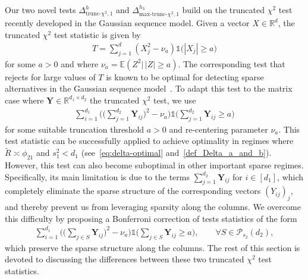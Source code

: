 \documentclass{article}
\newcommand{\R}{\mathbb{R}}
\newcommand{\one}{\mathds{1}}
\newcommand{\chisqlin}{\text{trunc-$\chi^2$}}
\newcommand{\chisqmax}{\text{max-trunc-$\chi^2$}}
\theoremstyle{remark}
\begin{document}
Our two novel tests $\Delta_{\chisqlin, 1}^h$ and $\Delta^{h_3}_{\chisqmax, 1}$ build on the truncated $\chi^2$ test recently developed in the Gaussian sequence model. 
Given a vector $X \in \R^d$, the truncated $\chi^2$ test statistic is given by
\begin{align*}
    T = \sum_{j=1}^d (X_j^2 - \nu_a) \one{\big(|X_j| \geq a\big)}
\end{align*}
for some $a>0$ and where $\nu_a = \mathbb E\left(Z^2 \big|\,|Z| \geq a\right)$. 
The corresponding test that rejects for large values of $T$ is known to be optimal for detecting sparse alternatives in the Gaussian sequence model~\citep{collier2017minimax}. 
To adapt this test to the matrix case where $\mathbf Y \in \R^{d_1 \times d_2}$ the truncated $\chi^2$ test, we use 
\begin{align*}
    \sum_{i=1}^{d_1} \Big(\Big(\sum_{j=1}^{d_2} \mathbf Y_{ij}\Big)^2 - \nu_a\Big)\one{\big(\sum_{j=1}^{d_2} \mathbf Y_{ij} \geq a\big)}
\end{align*}
for some suitable truncation threshold $a>0$ and re-centering parameter $\nu_a$. 
This test statistic can be successfully applied to achieve optimality in regimes where $\tilde R \asymp \phi_{21}$ and $s_1^2 < d_1$ (see~\eqref{eq:delta-optimal} and~\eqref{def_Delta_a_and_b}). 
However, this test can also become suboptimal in other important sparse regimes. 
Specifically, its main limitation is due to the terms $\sum_{j=1}^{d_2} \mathbf Y_{ij}$ for $i\in [d_1]$, which completely eliminate the sparse structure of the corresponding vectors $(Y_{ij})_{j}$, and thereby prevent us from leveraging sparsity along the columns. 
We overcome this difficulty by proposing a Bonferroni correction of tests statistics of the form
\begin{align*}
    \sum_{i=1}^{d_1} \Big(\Big(\sum_{j\in S} \mathbf Y_{ij}\Big)^2 - \nu_a\Big)\one{\big(\sum_{j\in S} \mathbf Y_{ij} \geq a\big)}, \qquad \forall S \in \mathcal{P}_{s_2}(d_2),
\end{align*}
which preserve the sparse structure along the columns.
The rest of this section is devoted to discussing the differences between these two truncated $\chi^2$ test statistics.
\end{document}

